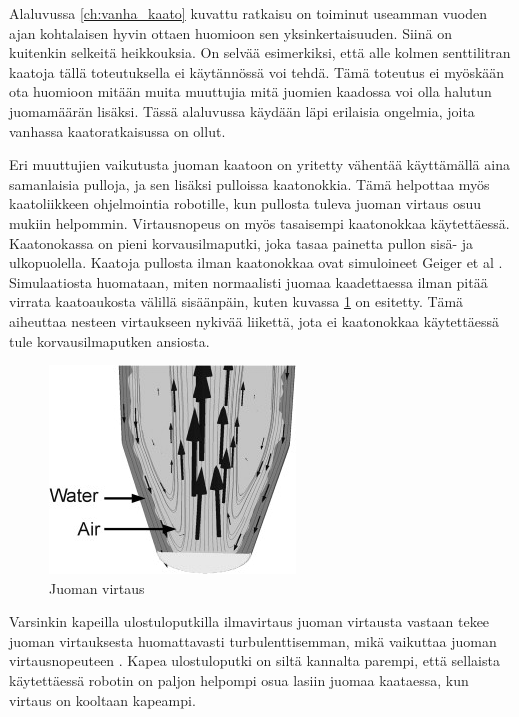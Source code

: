 Alaluvussa \ref{ch:vanha_kaato} kuvattu ratkaisu on toiminut useamman vuoden ajan kohtalaisen hyvin ottaen huomioon sen yksinkertaisuuden. Siinä on kuitenkin selkeitä heikkouksia. On selvää esimerkiksi, että alle kolmen senttilitran kaatoja tällä toteutuksella ei käytännössä voi tehdä. Tämä toteutus ei myöskään ota huomioon mitään muita muuttujia mitä juomien kaadossa voi olla halutun juomamäärän lisäksi. Tässä alaluvussa käydään läpi erilaisia ongelmia, joita vanhassa kaatoratkaisussa on ollut.

Eri muuttujien vaikutusta juoman kaatoon on yritetty vähentää käyttämällä aina samanlaisia pulloja, ja sen lisäksi pulloissa kaatonokkia. Tämä helpottaa myös kaatoliikkeen ohjelmointia robotille, kun pullosta tuleva juoman virtaus osuu mukiin helpommin. Virtausnopeus on myös tasaisempi kaatonokkaa käytettäessä. Kaatonokassa on pieni korvausilmaputki, joka tasaa painetta pullon sisä- ja ulkopuolella. Kaatoja pullosta ilman kaatonokkaa ovat simuloineet Geiger et al \cite{Geiger2012}. Simulaatiosta huomataan, miten normaalisti juomaa kaadettaessa ilman pitää virrata kaatoaukosta välillä sisäänpäin, kuten kuvassa \ref{fig:juomien_virtaus} on esitetty. Tämä aiheuttaa nesteen virtaukseen nykivää liikettä, jota ei kaatonokkaa käytettäessä tule korvausilmaputken ansiosta.

\begin{figure}[h]
\begin{center}
\includegraphics[scale=1.1]{img/Geiger et al. juoman virtaus.jpg}
\end{center}
\caption{Juoman virtaus \cite{Geiger2012}}
\label{fig:juomien_virtaus}
\end{figure}

Varsinkin kapeilla ulostuloputkilla ilmavirtaus juoman virtausta vastaan tekee juoman virtauksesta huomattavasti turbulenttisemman, mikä vaikuttaa juoman virtausnopeuteen \cite{Geiger2012}. Kapea ulostuloputki on siltä kannalta parempi, että sellaista käytettäessä robotin on paljon helpompi osua lasiin juomaa kaataessa, kun virtaus on kooltaan kapeampi.

